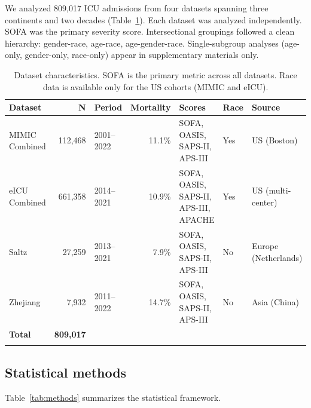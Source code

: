 \documentclass[pdflatex,sn-mathphys-num]{sn-jnl}
\theoremstyle{thmstyleone}%
\theoremstyle{thmstyletwo}%
\theoremstyle{thmstylethree}%
\begin{document}
We analyzed 809,017 ICU admissions from four datasets spanning three continents and two decades (Table~\ref{tab:datasets}). Each dataset was analyzed independently. SOFA was the primary severity score. Intersectional groupings followed a clean hierarchy: gender-race, age-race, age-gender-race. Single-subgroup analyses (age-only, gender-only, race-only) appear in supplementary materials only.

\begin{table}[htbp]
\caption{Dataset characteristics. SOFA is the primary metric across all datasets. Race data is available only for the US cohorts (MIMIC and eICU).}\label{tab:datasets}
\begin{tabular*}{\textwidth}{@{\extracolsep\fill}lrlrlll}
\toprule
Dataset & N & Period & Mortality & Scores & Race & Source \\
\midrule
MIMIC Combined & 112,468 & 2001--2022 & 11.1\% & SOFA, OASIS, SAPS-II, APS-III & Yes & US (Boston) \\
eICU Combined & 661,358 & 2014--2021 & 10.9\% & SOFA, OASIS, SAPS-II, APS-III, APACHE & Yes & US (multi-center) \\
Saltz & 27,259 & 2013--2021 & 7.9\% & SOFA, OASIS, SAPS-II, APS-III & No & Europe (Netherlands) \\
Zhejiang & 7,932 & 2011--2022 & 14.7\% & SOFA, OASIS, SAPS-II, APS-III & No & Asia (China) \\
\midrule
\textbf{Total} & \textbf{809,017} & & & & & \\
\botrule
\end{tabular*}
\end{table}

\subsection{Statistical methods}\label{subsec:statistics}

Table~\ref{tab:methods} summarizes the statistical framework.
\end{document}
